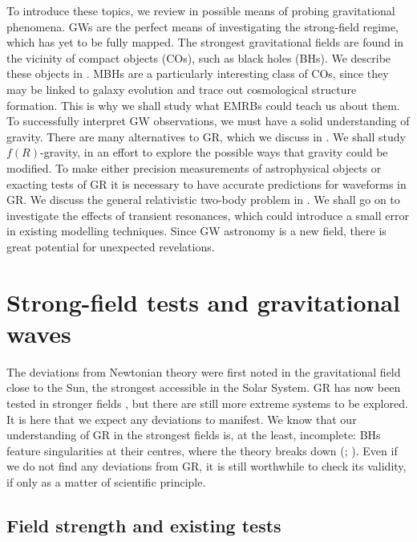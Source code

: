 To introduce these topics, we review in  possible means of probing gravitational phenomena. GWs are the perfect means of investigating the strong-field regime, which has yet to be fully mapped. The strongest gravitational fields are found in the vicinity of compact objects (COs), such as black holes (BHs). We describe these objects in . MBHs are a particularly interesting class of COs, since they may be linked to galaxy evolution and trace out cosmological structure formation. This is why we shall study what EMRBs could teach us about them. To successfully interpret GW observations, we must have a solid understanding of gravity. There are many alternatives to GR, which we discuss in . We shall study $f(R)$-gravity, in an effort to explore the possible ways that gravity could be modified. To make either precision measurements of astrophysical objects or exacting tests of GR it is necessary to have accurate predictions for waveforms in GR. We discuss the general relativistic two-body problem in . We shall go on to investigate the effects of transient resonances, which could introduce a small error in existing modelling techniques. Since GW astronomy is a new field, there is great potential for unexpected revelations.

\section{Strong-field tests and gravitational waves}\label{sec:strong-field}

The deviations from Newtonian theory were first noted in the gravitational field close to the Sun, the strongest accessible in the Solar System. GR has now been tested in stronger fields \citep{Will2006}, but there are still more extreme systems to be explored. It is here that we expect any deviations to manifest. We know that our understanding of GR in the strongest fields is, at the least, incomplete: BHs feature singularities at their centres, where the theory breaks down (\citealt[section 34.6]{Misner1973}; \citealt[chapter 9]{Wald1984}). Even if we do not find any deviations from GR, it is still worthwhile to check its validity, if only as a matter of scientific principle.

\subsection{Field strength and existing tests}\label{sec:exist-tests}

